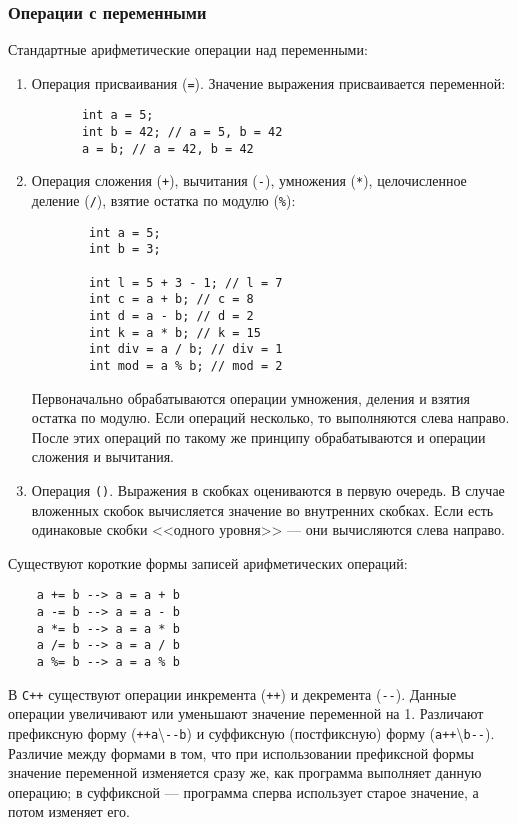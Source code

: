 \subsubsection{Операции с переменными}
Стандартные арифметические операции над переменными:
\begin{enumerate}
    \item Операция присваивания (\lstinline{=}). Значение выражения присваивается переменной:
    \begin{lstlisting}
       int a = 5;
       int b = 42; // a = 5, b = 42
       a = b; // a = 42, b = 42
    \end{lstlisting}
    \item Операция сложения (\lstinline{+}), вычитания (\lstinline{-}), умножения (\lstinline{*}), целочисленное деление (\lstinline{/}), взятие остатка по модулю (\lstinline{%}):
    \begin{lstlisting}
        int a = 5;
        int b = 3;

        int l = 5 + 3 - 1; // l = 7
        int c = a + b; // c = 8
        int d = a - b; // d = 2
        int k = a * b; // k = 15
        int div = a / b; // div = 1
        int mod = a % b; // mod = 2
    \end{lstlisting}

    Первоначально обрабатываются операции умножения, деления и взятия остатка по модулю. Если операций несколько, то выполняются слева направо. После этих операций по такому же принципу обрабатываются и операции сложения и вычитания.

    \item Операция \lstinline{()}. Выражения в скобках оцениваются в первую очередь. В случае вложенных скобок вычисляется значение во внутренних скобках. Если есть одинаковые скобки <<одного уровня>> --- они вычисляются слева направо.
\end{enumerate}

Существуют короткие формы записей арифметических операций:
\begin{lstlisting}
    a += b --> a = a + b
    a -= b --> a = a - b
    a *= b --> a = a * b
    a /= b --> a = a / b
    a %= b --> a = a % b
\end{lstlisting}

В \texttt{С++} существуют операции инкремента (\lstinline{++}) и декремента (\lstinline{--}). Данные операции увеличивают или уменьшают значение переменной на 1. Различают префиксную форму (\lstinline{++a}\textbackslash \lstinline{--b}) и суффиксную (постфиксную) форму (\lstinline{a++}\textbackslash \lstinline{b--}). Различие между формами в том, что при использовании префиксной формы значение переменной изменяется сразу же, как программа выполняет данную операцию; в суффиксной --- программа сперва использует старое значение, а потом изменяет его.

